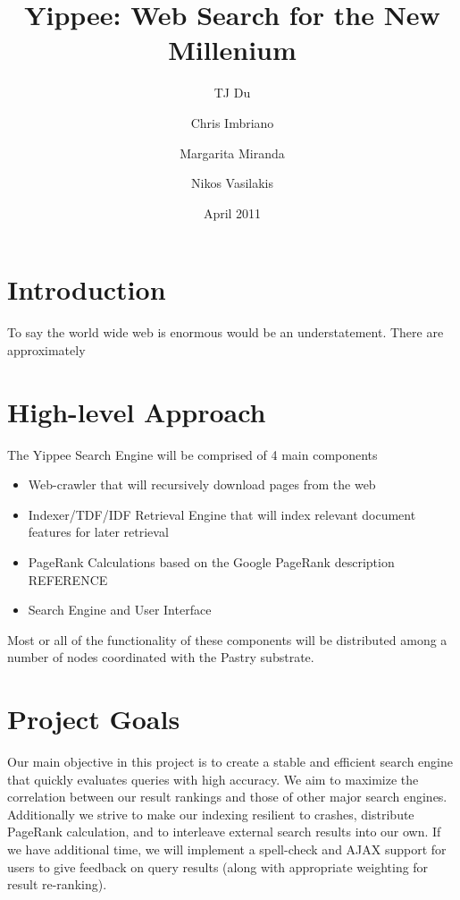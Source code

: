 \documentclass[11pt, letterpaper, oneside, twocolumn]{article}
\begin{document}
\title{Yippee: Web Search for the New Millenium}
\author{	TJ Du
	\and Chris Imbriano
	\and Margarita Miranda
	\and Nikos Vasilakis}
\date{April 2011}

\maketitle

\section{ Introduction }

To say the world wide web is enormous would be an understatement.  There are approximately 

\section{ High-level Approach }

The Yippee Search Engine will be comprised of 4 main components
\begin{itemize}
\item Web-crawler that will recursively download pages from the web
\item Indexer/TDF/IDF Retrieval Engine that will index relevant document features for later retrieval 
\item PageRank Calculations based on the Google PageRank description REFERENCE
\item Search Engine and User Interface
\end{itemize}

Most or all of the functionality of these components will be distributed among a number of nodes coordinated with the Pastry substrate.

\section{ Project Goals }

Our main objective in this project is to create a stable and efficient search engine that quickly evaluates queries with high accuracy. We aim to maximize the correlation between our result rankings and those of other major search engines. Additionally we strive to make our indexing resilient to crashes, distribute PageRank calculation, and to interleave external search results into our own. If we have additional time, we will implement a spell-check and AJAX support for users to give feedback on query results (along with appropriate weighting for result re-ranking).
\end{document}
